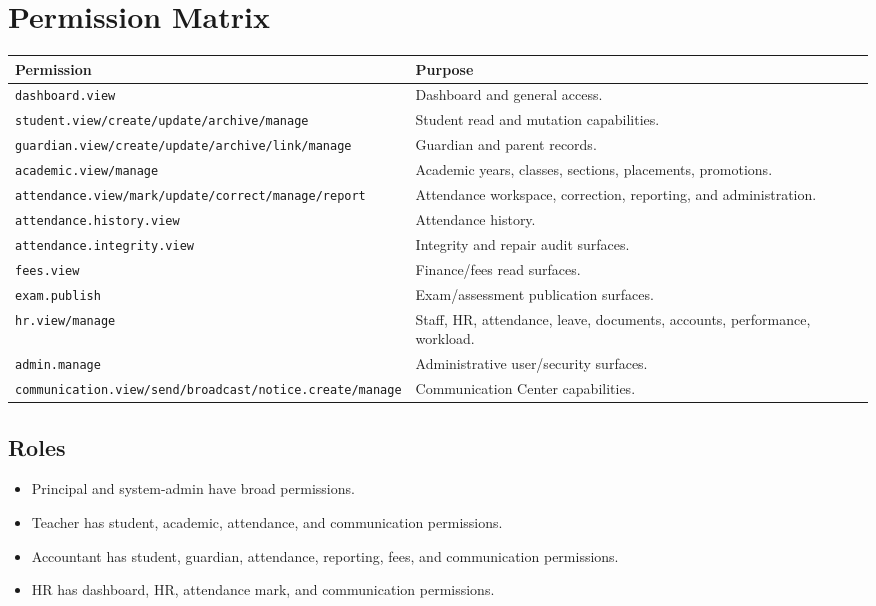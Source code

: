 \chapter{Permission Matrix}
\label{app:permissions}
\begin{longtable}{@{}p{}p{}@{}}
\toprule
\textbf{Permission} & \textbf{Purpose}\\
\midrule
\texttt{dashboard.view} & Dashboard and general access.\\
\texttt{student.view/create/update/archive/manage} & Student read and mutation capabilities.\\
\texttt{guardian.view/create/update/archive/link/manage} & Guardian and parent records.\\
\texttt{academic.view/manage} & Academic years, classes, sections, placements, promotions.\\
\texttt{attendance.view/mark/update/correct/manage/report} & Attendance workspace, correction, reporting, and administration.\\
\texttt{attendance.history.view} & Attendance history.\\
\texttt{attendance.integrity.view} & Integrity and repair audit surfaces.\\
\texttt{fees.view} & Finance/fees read surfaces.\\
\texttt{exam.publish} & Exam/assessment publication surfaces.\\
\texttt{hr.view/manage} & Staff, HR, attendance, leave, documents, accounts, performance, workload.\\
\texttt{admin.manage} & Administrative user/security surfaces.\\
\texttt{communication.view/send/broadcast/notice.create/manage} & Communication Center capabilities.\\
\bottomrule
\end{longtable}

\section{Roles}
\begin{itemize}
\item Principal and system-admin have broad permissions.
\item Teacher has student, academic, attendance, and communication permissions.
\item Accountant has student, guardian, attendance, reporting, fees, and communication permissions.
\item HR has dashboard, HR, attendance mark, and communication permissions.
\end{itemize}
